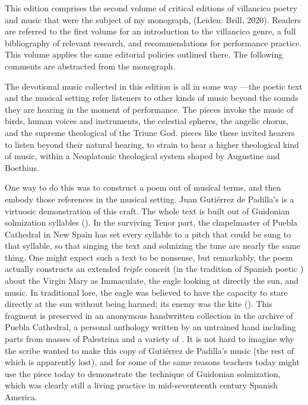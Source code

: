 This edition comprises the second volume of critical editions of villancico
poetry and music that were the subject of my monograph,  (Leiden: Brill, 2020).
Readers are referred to the first volume for an introduction to the
villancico genre, a full bibliography of relevant research, and
recommendations for performance practice.%
    \Autocite{Cashner:WLSCM32}
This volume applies the same editorial policies outlined there.
The following comments are abstracted from the monograph.

The devotional music collected in this edition is all in some way
---the poetic text and the musical setting refer
listeners to other kinds of music beyond the sounds they are hearing in the
moment of performance.
The pieces invoke the music of birds, human voices and instruments, the
celestial spheres, the angelic chorus, and the supreme theological
 of the Triune God.
 pieces like these invited hearers to listen beyond their
natural hearing, to strain to hear a higher theological kind of music, within
a Neoplatonic theological system shaped by Augustine and Boethius.

One way to do this was to construct a poem out of musical terms, and then
embody those references in the musical setting.
Juan Gutiérrez de Padilla's  is a
virtuosic demonstration of this craft.
The whole text is built out of Guidonian solmization syllables ().
In the surviving Tenor part, the chapelmaster of Puebla Cathedral in New Spain
has set every syllable to a pitch that could be sung to that syllable, so that
singing the text and solmizing the tune are nearly the same thing.
One might expect such a text to be nonsense, but remarkably, the poem actually
constructs an extended \emph{triple} conceit (in the tradition of Spanish poetic
) about the Virgin Mary as Immaculate, the eagle looking at
directly the sun, and music.
In traditional lore, the eagle was believed to have the capacity to stare
directly at the sun without being harmed; its enemy was the kite
().
This fragment is preserved in an anonymous handwritten collection in the
archive of Puebla Cathedral, a personal anthology written by an untrained hand
including parts from masses of Palestrina and a variety of .
It is not hard to imagine why the scribe wanted to make this copy of Gutiérrez
de Padilla's music (the rest of which is apparently lost), and for some of the
same reasons teachers today might use the piece today to demonstrate the
technique of Guidonian solmization, which was clearly still a living practice
in mid-seventeenth century Spanish America.

